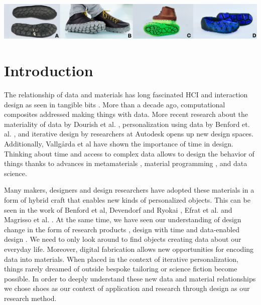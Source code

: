 % 



 
 \begin{teaserfigure}
\includegraphics[width=.99\textwidth]{Header}
\caption{}
\label{fig:header}
\end{teaserfigure}

\section{Introduction}
The relationship of data and materials has long fascinated HCI and interaction design as seen in tangible bits \cite{Ishii1997}. More than a decade ago, computational composites \cite{Vallgarda2007} addressed making things with data. More recent research about the materiality of data by Dourish et al. \cite{Dourish2017} , personalization using data by Benford et. al. \cite{Benford2017}, and iterative design by researchers at Autodesk \cite{Nourbakhsh2016} opens up new design spaces. Additionally, Vallg\aa rda et al \cite{Vallgarda2015} have shown the importance of time in design. Thinking about time and access to complex data allows to design the behavior of things thanks to advances in metamaterials \cite{Ion2018a}, material programming \cite{Vallgarda2016}, and data science. 

Many makers, designers and design researchers have adopted these materials in a form of hybrid craft that enables new kinds of personalized objects. This can be seen in the work of Benford et al, \cite{Benford2018} Devendorf and Ryokai \cite{Devendorf2015}, Efrat et al. \cite{Efrat2016} and Magrisso et al. \cite{Magrisso2018}. At the same time, we have seen our understanding of design change in the form of research products \cite{Odom2016}, design with time \cite{Odom2018} and data-enabled design  \cite{Bogers2016a}. We need to only look around to find objects creating data about our everyday life. Moreover, digital fabrication allows new opportunities for encoding data into materials. When placed in the context of iterative personalization, things rarely dreamed of outside bespoke tailoring or science fiction become possible. In order to deeply understand these new data and material relationships we chose shoes as our context of application and research through design as our research method.

